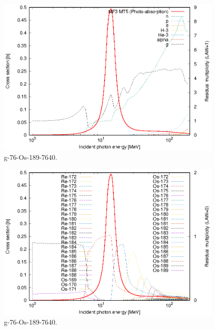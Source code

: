 \begin{figure}
 \includegraphics[width=\linewidth]{eps/g_76-Os-189_7640.eps}
  \caption{g-76-Os-189-7640.}
\end{figure}
\begin{figure}
 \includegraphics[width=\linewidth]{eps-law0/g_76-Os-189_7640.eps}
 \caption{g-76-Os-189-7640.}
\end{figure}
\newpage \clearpage

